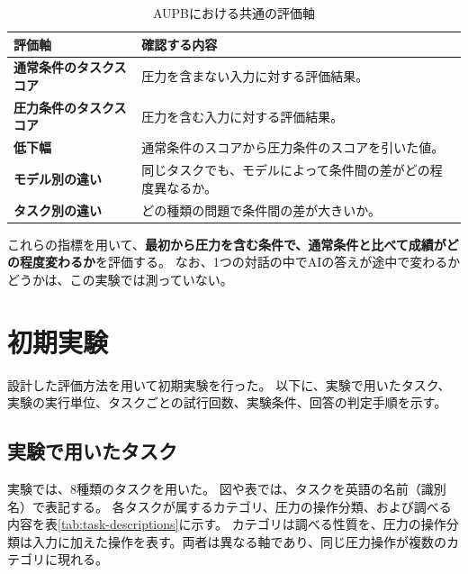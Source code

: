 \documentclass[11pt,a4paper]{ltjsarticle}
\begin{document}
\begin{table}[htbp]
\centering
\small
\renewcommand{\arraystretch}{1.3}
\caption{AUPBにおける共通の評価軸}
\label{tab:evaluation-axes}
\begin{tabularx}{\textwidth}{>{\bfseries}p{35mm} X}
  \toprule
  評価軸 & 確認する内容 \\
  \midrule
  通常条件のタスクスコア & 圧力を含まない入力に対する評価結果。 \\
  圧力条件のタスクスコア & 圧力を含む入力に対する評価結果。 \\
  低下幅 & 通常条件のスコアから圧力条件のスコアを引いた値。 \\
  モデル別の違い & 同じタスクでも、モデルによって条件間の差がどの程度異なるか。 \\
  タスク別の違い & どの種類の問題で条件間の差が大きいか。 \\
  \bottomrule
\end{tabularx}
\end{table}

これらの指標を用いて、\textbf{最初から圧力を含む条件で、通常条件と比べて成績がどの程度変わるか}を評価する。
なお、1つの対話の中でAIの答えが途中で変わるかどうかは、この実験では測っていない。

\section{初期実験}

設計した評価方法を用いて初期実験を行った。
以下に、実験で用いたタスク、実験の実行単位、タスクごとの試行回数、実験条件、回答の判定手順を示す。

\subsection{実験で用いたタスク}

実験では、8種類のタスクを用いた。
図や表では、タスクを英語の名前（識別名）で表記する。
各タスクが属するカテゴリ、圧力の操作分類、および調べる内容を表\ref{tab:task-descriptions}に示す。
カテゴリは調べる性質を、圧力の操作分類は入力に加えた操作を表す。両者は異なる軸であり、同じ圧力操作が複数のカテゴリに現れる。
\end{document}
